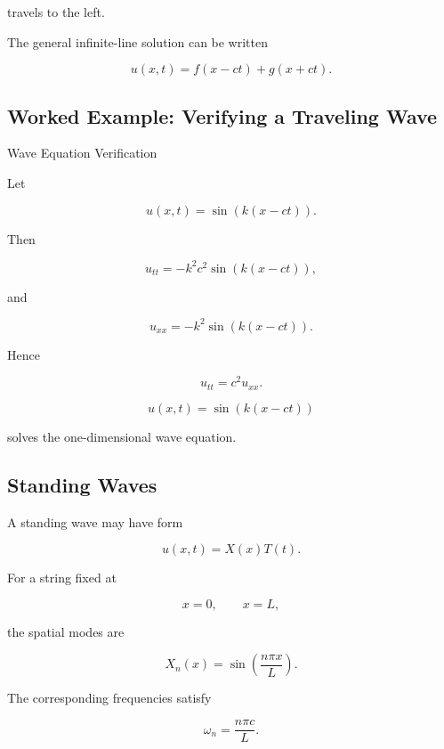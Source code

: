 travels to the left.

The general infinite-line solution can be written

\[
\boxed{
u(x,t)
=
f(x-ct)+g(x+ct).
}
\]

\subsection{Worked Example: Verifying a Traveling Wave}
\label{subsec:worked-traveling-wave}

\begin{workedexamplebox}{Wave Equation Verification}

Let

\[
u(x,t)
=
\sin(k(x-ct)).
\]

Then

\[
u_{tt}
=
-k^2c^2
\sin(k(x-ct)),
\]

and

\[
u_{xx}
=
-k^2
\sin(k(x-ct)).
\]

Hence

\[
u_{tt}
=
c^2u_{xx}.
\]

\begin{answerbox}
\[
\boxed{
u(x,t)
=
\sin(k(x-ct))
}
\]

solves the one-dimensional wave equation.
\end{answerbox}

\end{workedexamplebox}

\subsection{Standing Waves}
\label{subsec:standing-waves}

A standing wave may have form

\[
\boxed{
u(x,t)
=
X(x)T(t).
}
\]

For a string fixed at

\[
x=0,
\qquad
x=L,
\]

the spatial modes are

\[
\boxed{
X_n(x)
=
\sin
\left(
\frac{n\pi x}{L}
\right).
}
\]

The corresponding frequencies satisfy

\[
\boxed{
\omega_n
=
\frac{n\pi c}{L}.
}
\]

